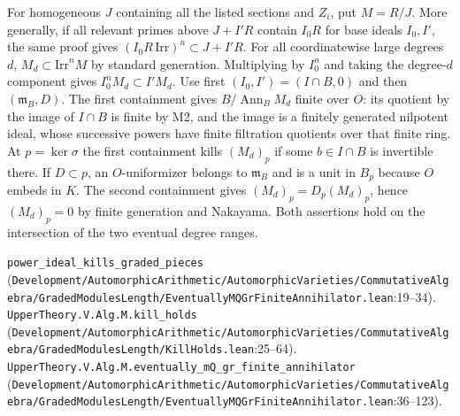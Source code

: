 For homogeneous $J$ containing all the listed sections and $Z_i$, put
$M=R/J$. More generally, if all relevant primes above $J+I'R$ contain $I_0 R$
for base ideals $I_0,I'$, the same proof gives
$(I_0R\,\mathrm{Irr})^n\subset J+I'R$. For all coordinatewise large degrees
$d$, $M_d\subset\mathrm{Irr}^n M$ by standard generation. Multiplying by
$I_0^n$ and taking the degree-$d$ component gives $I_0^n M_d\subset I'M_d$.
Use first $(I_0,I')=(I\cap B,0)$ and then $(\mathfrak m_B,D)$.
The first containment gives $B/\operatorname{Ann}_B M_d$ finite over $O$:
its quotient by the image of $I\cap B$ is finite by M2, and the image is a
finitely generated nilpotent ideal, whose successive powers have finite
filtration quotients over that finite ring. At $p=\ker\sigma$ the first
containment kills $(M_d)_p$ if some $b\in I\cap B$ is invertible there.
If $D\subset p$, an $O$-uniformizer belongs to $\mathfrak m_B$ and is a unit
in $B_p$ because $O$ embeds in $K$. The second containment gives
$(M_d)_p=D_p(M_d)_p$, hence $(M_d)_p=0$ by finite generation and Nakayama.
Both assertions hold on the intersection of the two eventual degree ranges.
\par{\footnotesize \nolinkurl{power_ideal_kills_graded_pieces} (\nolinkurl{Development/AutomorphicArithmetic/AutomorphicVarieties/CommutativeAlgebra/GradedModulesLength/EventuallyMQGrFiniteAnnihilator.lean}\allowbreak:19--34). \nolinkurl{UpperTheory.V.Alg.M.kill_holds} (\nolinkurl{Development/AutomorphicArithmetic/AutomorphicVarieties/CommutativeAlgebra/GradedModulesLength/KillHolds.lean}\allowbreak:25--64). \nolinkurl{UpperTheory.V.Alg.M.eventually_mQ_gr_finite_annihilator} (\nolinkurl{Development/AutomorphicArithmetic/AutomorphicVarieties/CommutativeAlgebra/GradedModulesLength/EventuallyMQGrFiniteAnnihilator.lean}\allowbreak:36--123).\par}


